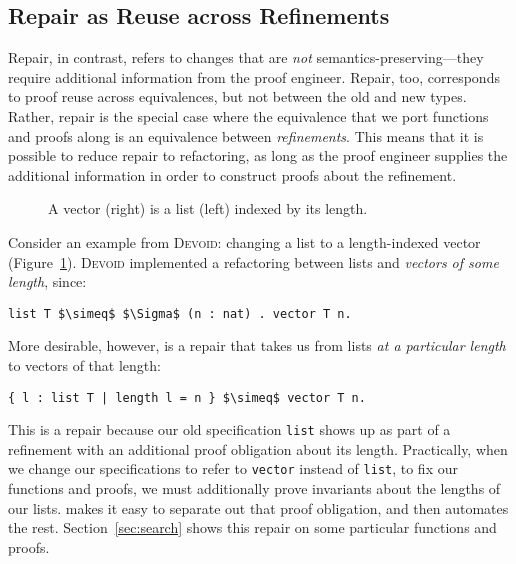 \subsection{Repair as Reuse across Refinements}
\label{sec:repair}

Repair, in contrast, refers to changes that are \textit{not} semantics-preserving---they require additional information
from the proof engineer.
Repair, too, corresponds to proof reuse across equivalences, but not between the old and new types.
Rather, repair is the special case where the equivalence that we port functions and proofs along
is an equivalence between \textit{refinements}.
This means that it is possible to reduce repair to refactoring, as long as the proof engineer supplies the additional information in
order to construct proofs about the refinement.

\begin{figure}
\begin{minipage}{0.40\textwidth}
   
\end{minipage}
\hfill
\begin{minipage}{0.58\textwidth}
   
\end{minipage}
\caption{A vector (right) is a list (left) indexed by its length.}
\label{fig:listtovect}
\end{figure}

Consider an example from \textsc{Devoid}: changing a list to a length-indexed vector (Figure~\ref{fig:listtovect}).
\textsc{Devoid} implemented a refactoring between lists and \textit{vectors of some length}, since:

\begin{lstlisting}
list T $\simeq$ $\Sigma$ (n : nat) . vector T n.
\end{lstlisting}
More desirable, however, is a repair that takes us from lists \textit{at a particular length} to vectors of that length:

\begin{lstlisting}
{ l : list T | length l = n } $\simeq$ vector T n.
\end{lstlisting}
This is a repair because our old specification \lstinline{list} shows up as part of a refinement with an additional proof obligation
about its length. Practically, when we change our specifications to refer to \lstinline{vector} instead of \lstinline{list},
to fix our functions and proofs, we must additionally prove invariants about the lengths of our lists.
\toolname makes it easy to separate out that proof obligation, and then automates the rest.
Section~\ref{sec:search} shows this repair on some particular functions and proofs.

